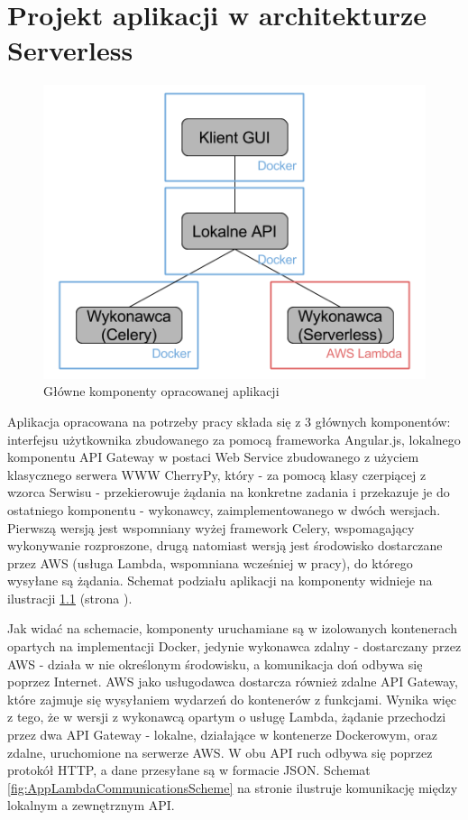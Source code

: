 \documentclass[oneside]{mgr}
\begin{document}
\chapter{Projekt aplikacji w architekturze Serverless}
\begin{figure}
	\centering
	\includegraphics[width=13cm]{app_architecture}
	\caption{Główne komponenty opracowanej aplikacji}
	\label{fig:AppComponents}
\end{figure}

Aplikacja opracowana na potrzeby pracy składa się z 3 głównych komponentów: interfejsu użytkownika zbudowanego za pomocą frameworka Angular.js, lokalnego komponentu API Gateway w postaci Web Service zbudowanego z użyciem klasycznego serwera WWW CherryPy, który - za pomocą klasy czerpiącej z wzorca Serwisu - przekierowuje żądania na konkretne zadania i przekazuje je do ostatniego komponentu - wykonawcy, zaimplementowanego w dwóch wersjach. Pierwszą wersją jest wspomniany wyżej framework Celery, wspomagający wykonywanie rozproszone, drugą natomiast wersją jest środowisko dostarczane przez AWS (usługa Lambda, wspomniana wcześniej w pracy), do którego wysyłane są żądania. Schemat podziału aplikacji na komponenty widnieje na ilustracji \ref{fig:AppComponents} (strona \pageref{fig:AppComponents}).

Jak widać na schemacie, komponenty uruchamiane są w izolowanych kontenerach opartych na implementacji Docker, jedynie wykonawca zdalny - dostarczany przez AWS - działa w nie określonym środowisku, a komunikacja doń odbywa się poprzez Internet. AWS jako usługodawca dostarcza również zdalne API Gateway, które zajmuje się wysyłaniem wydarzeń do kontenerów z funkcjami. Wynika więc z tego, że w wersji z wykonawcą opartym o usługę Lambda, żądanie przechodzi przez dwa API Gateway - lokalne, działające w kontenerze Dockerowym, oraz zdalne, uruchomione na serwerze AWS. W obu API ruch odbywa się poprzez protokół HTTP, a dane przesyłane są w formacie JSON. Schemat \ref{fig:AppLambdaCommunicationsScheme} na stronie \pageref{fig:AppLambdaCommunicationsScheme} ilustruje komunikację między lokalnym a zewnętrznym API.
\end{document}
